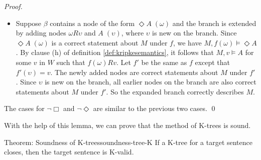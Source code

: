 \begin{proof}
\begin{itemize}
    \item Suppose $\beta$ contains a node of the form $\Diamond A \;(\omega)$
          and the branch is extended by adding nodes $\omega R \upsilon$ and
          $A \;(\upsilon)$, where $\upsilon$ is new on the branch. Since
          $\Diamond A \;(\omega)$ is a correct statement about $M$ under $f$, we
          have $M,f(\omega) \models \Diamond A$. By clause (h) of definition
          \ref{def:kripkesemantics}, it follows that $M,v \models A$ for some
          $v$ in $W$ such that $f(\omega)Rv$. Let $f'$ be the same as $f$ except
          that $f'(\upsilon) = v$. The newly added nodes are correct statements
          about $M$ under $f'$. Since $\upsilon$ is new on the branch, all
          earlier nodes on the branch are also correct statements about $M$
          under $f'$. So the expanded branch correctly describes $M$.

           
  \end{itemize}
  The cases for $\neg \Box$ and $\neg \Diamond$ are similar to the previous two
  cases. \qed

\end{proof}

\medskip

With the help of this lemma, we can prove that the method of K-trees is sound.

\begin{theorem}{Theorem: Soundness of K-trees}{soundness-tree-K}
  If a K-tree for a target sentence closes, then the target sentence is K-valid.
\end{theorem}

